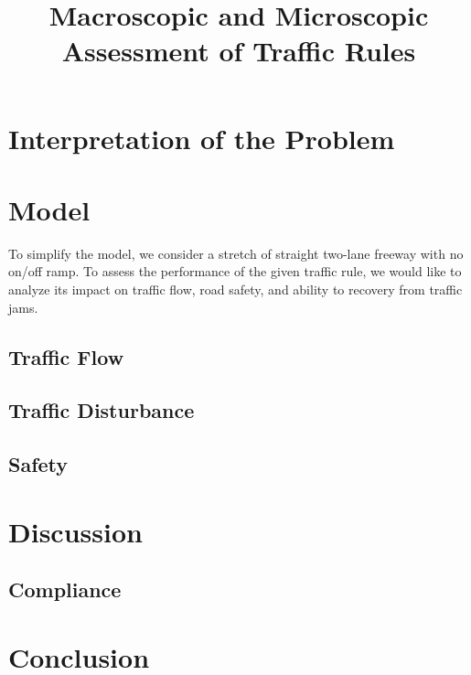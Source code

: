 \documentclass[aps,prl,superscriptaddress,12pt]{revtex4-1}
\begin{document}
	\title{Macroscopic and Microscopic Assessment of Traffic Rules}
		
	\begin{abstract}
		
	\end{abstract}
	
\maketitle

	\section{Interpretation of the Problem}


	\section{Model}
	To simplify the model, we consider a stretch of straight two-lane freeway with no on/off ramp. To assess the performance of the given traffic rule, we would like to analyze its impact on traffic flow, road safety, and ability to recovery from traffic jams.
		\subsection{Traffic Flow} 
		
	
		\subsection{Traffic Disturbance}
			
	
		\subsection{Safety}
		
	
	\section{Discussion}
		\subsection{Compliance}
		
	
	\section{Conclusion}

	
	


\end{document}
